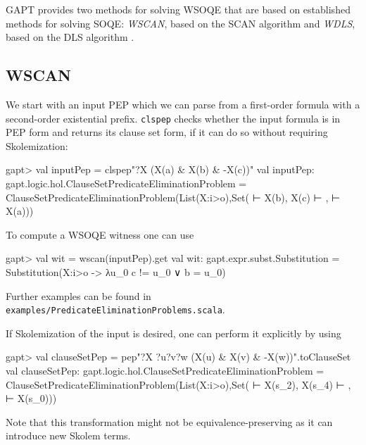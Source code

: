 \documentclass[a4paper,11pt]{book}
\begin{document}
GAPT provides two methods for solving WSOQE that are based on established methods for solving SOQE: \emph{WSCAN}, based on the SCAN algorithm \cite{Gabbay1992Quantifier} and \emph{WDLS}, based on the DLS algorithm \cite{Doherty1997Computing}.

\subsection{WSCAN}

We start with an input PEP which we can parse from a first-order formula with a second-order existential prefix. \texttt{clspep} checks whether the input formula is in PEP form and returns its clause set form, if it can do so without requiring Skolemization:
\begin{clilisting}
  gapt> val inputPep = clspep"?X (X(a) & X(b) & -X(c))"
  val inputPep: gapt.logic.hol.ClauseSetPredicateEliminationProblem = ClauseSetPredicateEliminationProblem(List(X:i>o),Set( ⊢ X(b), X(c) ⊢ ,  ⊢ X(a)))

\end{clilisting}

To compute a WSOQE witness one can use
\begin{clilisting}
  gapt> val wit = wscan(inputPep).get
  val wit: gapt.expr.subst.Substitution = Substitution(X:i>o -> λu_0 c != u_0 ∨ b = u_0)

\end{clilisting}

Further examples can be found in \texttt{examples/PredicateEliminationProblems.scala}.

If Skolemization of the input is desired, one can perform it explicitly by using
\begin{clilisting}
  gapt> val clauseSetPep = pep"?X ?u?v?w (X(u) & X(v) & -X(w))".toClauseSet
  val clauseSetPep: gapt.logic.hol.ClauseSetPredicateEliminationProblem = ClauseSetPredicateEliminationProblem(List(X:i>o),Set( ⊢ X(s_2), X(s_4) ⊢ ,  ⊢ X(s_0)))

\end{clilisting}
Note that this transformation might not be equivalence-preserving as it can introduce new Skolem terms.
\end{document}
